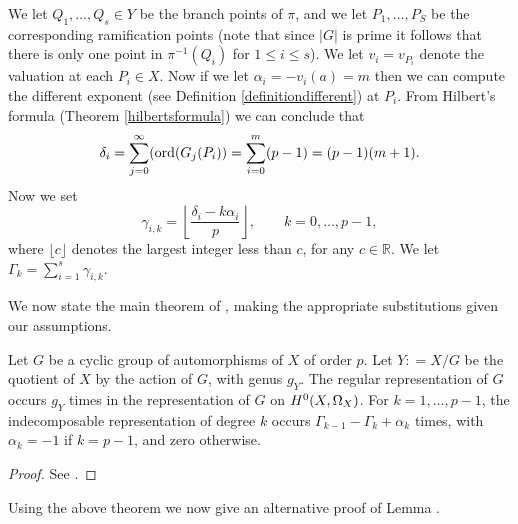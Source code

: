 We let $Q_1, \ldots, Q_s \in Y$ be the branch points of $\pi$, and we let $P_1, \ldots, P_S$ be the corresponding ramification points (note that since $|G|$ is prime it follows that there is only one point in $\pi^{-1}(Q_i)$ for $1 \leq i \leq s$).
We let $v_i = v_{P_i}$ denote the valuation at each $P_i \in X$.
Now if we let $\alpha_i = -v_i(a) = m$ then we can compute the different exponent (see Definition \ref{definitiondifferent}) at $P_i$.
From Hilbert's formula (Theorem \ref{hilbertsformula}) we can conclude that
    \[
    \delta_i = \sum_{j=0}^\infty (\operatorname{ord}(G_j(P_i)) = \sum_{i=0}^{m}(p-1) = (p-1)(m+1).
    \]
Now we set
    \[
    \gamma_{i,k} = \left\lfloor \frac{\delta_i - k \alpha_i}{p} \right\rfloor, \qquad k = 0, \ldots, p-1,
    \]
where $\lfloor c \rfloor$ denotes the largest integer less than $c$, for any $c \in \mathbb R$.
We let $\Gamma_k = \sum_{i=1}^s \gamma_{i,k}$.

We now state the main theorem of \cite{valmadan}, making the appropriate substitutions given our assumptions.

    \begin{thm}
    Let $G$ be a cyclic group of automorphisms of $X$ of order $p$.
    Let $Y : = X/G$ be the quotient of $X$ by the action of $G$, with genus $g_Y$.
    The regular representation of $G$ occurs $g_Y$ times in the representation of $G$ on ${H^0(X,\Omega_X)}$.
    For $k=1, \ldots, p-1$, the indecomposable representation of degree $k$ occurs $\Gamma_{k-1} - \Gamma_k + \alpha_k$ times, with $\alpha_k = -1$ if $k = p-1$, and zero otherwise.
    \end{thm}
    \begin{proof}
    See \cite[Thm.\ 1]{valmadan}.
    \end{proof}

Using the above theorem we now give an alternative proof of Lemma .

